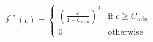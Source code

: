 \begin{equation}
 \delta^{**}(c) = 
 \begin{cases} 
 \left(\frac{c}{1-C_{min}}\right)^2 & \text{if } c \geq C_{min} \\
 0 & \text{otherwise}
 \end{cases}
 \label{ch1:equ:utilisation-scaling-factor}
\end{equation}
